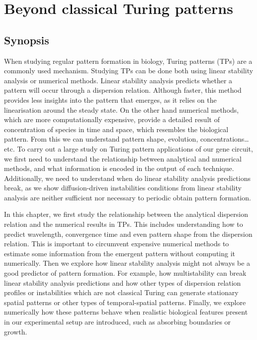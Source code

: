 \chapter{Beyond classical Turing patterns}\label{Chapter 1}
\section{Synopsis}
When studying regular pattern formation in biology, Turing patterns (TPs) are a commonly used mechanism.
Studying TPs can be done both using linear stability analysis or numerical methods.
Linear stability analysis predicts whether a pattern will occur through a dispersion relation.
Although faster, this method provides less insights into the pattern that emerges, as it relies on the linearisation around the steady state.
On the other hand numerical methods, which are more computationally expensive, provide a detailed result of concentration of species in time and space, which resembles the biological pattern.
From this we can understand pattern shape, evolution, concentrations\ldots etc.
To carry out a large study on Turing pattern applications of our gene circuit, we first need to understand the relationship between analytical and numerical methods, and what information is encoded in the output of each technique.
Additionally, we need to understand when do linear stability analysis predictions break, as we show diffusion-driven instabilities conditions from linear stability analysis are neither sufficient nor necessary to periodic obtain pattern formation.

In this chapter, we first study the relationship between the analytical dispersion relation and the numerical results in TPs.
This includes understanding how to predict wavelength,
convergence time and even pattern shape from the dispersion relation.
This is important to circumvent expensive numerical methods to estimate some information from the emergent pattern without computing it numerically.
Then we explore how linear stability analysis might not always be a good predictor of pattern formation.
For example, how multistability can break linear stability analysis predictions and how other types of dispersion relation profiles or instabilities which are not classical Turing can generate stationary spatial patterns or other types of temporal-spatial patterns.
Finally, we explore numerically how these patterns behave when realistic biological features present in our experimental setup are introduced, such as absorbing boundaries or growth.



